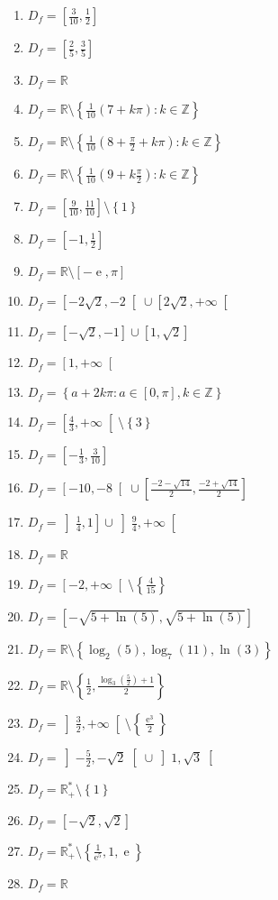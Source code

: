 \documentclass[a4paper,12pt]{article}
\newcommand{\set}[1]{\left\{#1\right\}}
\newcommand{\minuss}[1]{\setminus\left\{#1\right\}}
\newcommand{\minusiff}[1]{\setminus\left\lbrack#1\right\rbrack}
\newcommand{\intoo}[1]{\left\rbrack#1\right\lbrack}
\newcommand{\intof}[1]{\left\rbrack#1\right\rbrack}
\newcommand{\intfo}[1]{\left\lbrack#1\right\lbrack}
\newcommand{\intff}[1]{\left\lbrack#1\right\rbrack}
\DeclareMathOperator{\e}{e}
\begin{document}
\begin{multicols}{2}
\begin{enumerate}
\item $D_f=\intff{\frac{3}{10},\frac{1}{2}}$
\item $D_f=\intff{\frac{2}{5},\frac{3}{5}}$
\item $D_f=\mathbb{R}$
\item $D_f=\mathbb{R}\minuss{\frac{1}{10}\left(7+k\pi\right) : k\in\mathbb{Z}}$
\item $D_f=\mathbb{R}\minuss{\frac{1}{10}\left(8+\frac{\pi}{2}+k\pi\right) : k\in\mathbb{Z}}$
\item $D_f=\mathbb{R}\minuss{\frac{1}{10}\left(9+k\frac{\pi}{2}\right) : k\in\mathbb{Z}}$
\item $D_f=\intff{\frac{9}{10},\frac{11}{10}}\minuss{1}$
\item $D_f=\intff{-1,\frac{1}{2}}$
\item $D_f=\mathbb{R}\minusiff{-\e,\pi}$
\item $D_f=\intfo{-2\sqrt{2},-2}\cup\intfo{2\sqrt{2},+\infty}$
\item $D_f=\intff{-\sqrt{2},-1}\cup\intff{1,\sqrt{2}}$
\item $D_f=\intfo{1,+\infty}$
\item $D_f=\set{a+2k\pi: a\in\intff{0,\pi}, k\in\mathbb{Z}}$
\item $D_f=\intfo{\frac{4}{3},+\infty}\minuss{3}$
\item $D_f=\intff{-\frac{1}{3},\frac{3}{10}}$
\item $D_f=\intfo{-10,-8}\cup\intff{\frac{-2-\sqrt{14}}{2},\frac{-2+\sqrt{14}}{2}}$
\item $D_f=\intof{\frac{1}{4},1}\cup\intoo{\frac{9}{4},+\infty}$
\item $D_f=\mathbb{R}$
\item $D_f=\intfo{-2,+\infty}\minuss{\frac{4}{15}}$
\item $D_f=\intff{-\sqrt{5+\ln(5)},\sqrt{5+\ln(5)}}$
\item $D_f=\mathbb{R}\minuss{\log_2(5),\log_7(11),\ln(3)}$
\item $D_f=\mathbb{R}\minuss{\frac{1}{2},\frac{\log_3\left(\frac{5}{2}\right)+1}{2}}$
\item $D_f=\intoo{\frac{3}{2},+\infty}\minuss{\frac{\e^3}{2}}$
\item $D_f=\intoo{-\frac{5}{2},-\sqrt{2}}\cup\intoo{1,\sqrt{3}}$
\item $D_f=\mathbb{R_+^*}\minuss{1}$
\item $D_f=\intff{-\sqrt{2},\sqrt{2}}$
\item $D_f=\mathbb{R_+^*}\minuss{\frac{1}{\e^5},1,\e}$
\item $D_f=\mathbb{R}$

\end{enumerate}
\end{multicols}
\end{document}
